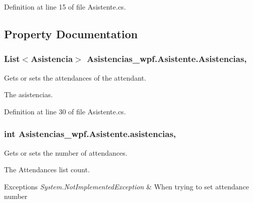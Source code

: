 Definition at line 15 of file Asistente.\-cs.



\subsection{Property Documentation}
\hypertarget{class_asistencias__wpf_1_1_asistente_a7f5283d025ade6827ef7504f111bc1c7}{
\subsubsection[{Asistencias}]{\setlength{\rightskip}{0pt plus 5cm}List$<${\bf Asistencia}$>$ Asistencias\-\_\-wpf.\-Asistente.\-Asistencias\hspace{0.3cm}{\ttfamily [get]}, {\ttfamily [set]}}}\label{class_asistencias__wpf_1_1_asistente_a7f5283d025ade6827ef7504f111bc1c7}


Gets or sets the attendances of the attendant. 

The asistencias. 

Definition at line 30 of file Asistente.\-cs.

\hypertarget{class_asistencias__wpf_1_1_asistente_a3457b6737f1c9a57b1e19d27c10405c9}{
\subsubsection[{asistencias}]{\setlength{\rightskip}{0pt plus 5cm}int Asistencias\-\_\-wpf.\-Asistente.\-asistencias\hspace{0.3cm}{\ttfamily [get]}, {\ttfamily [set]}}}\label{class_asistencias__wpf_1_1_asistente_a3457b6737f1c9a57b1e19d27c10405c9}


Gets or sets the number of attendances. 

The Attendances list count. 


\begin{DoxyExceptions}{Exceptions}
{\em System.\-Not\-Implemented\-Exception} & When trying to set attendance number\\
\hline
\end{DoxyExceptions}


